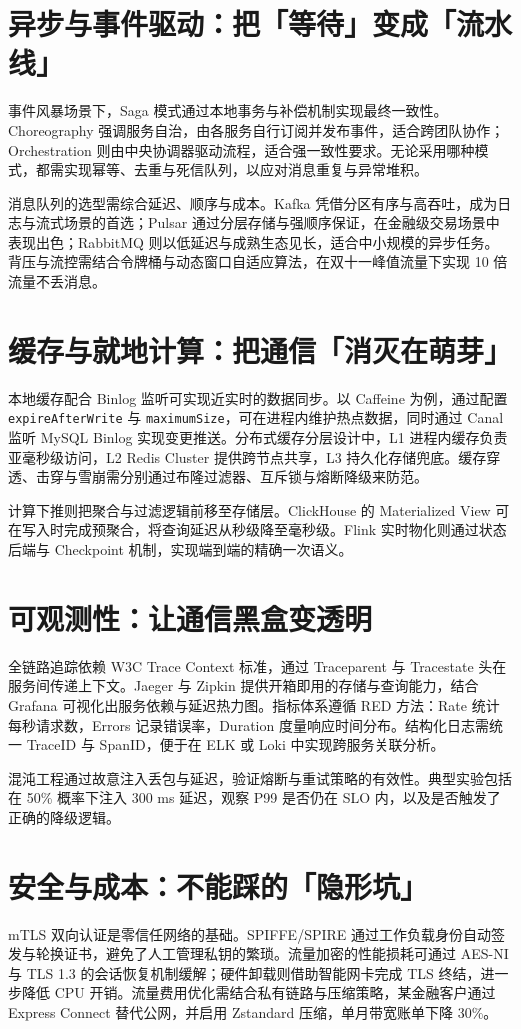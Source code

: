 \chapter{异步与事件驱动：把「等待」变成「流水线」}
事件风暴场景下，Saga 模式通过本地事务与补偿机制实现最终一致性。Choreography 强调服务自治，由各服务自行订阅并发布事件，适合跨团队协作；Orchestration 则由中央协调器驱动流程，适合强一致性要求。无论采用哪种模式，都需实现幂等、去重与死信队列，以应对消息重复与异常堆积。\par
消息队列的选型需综合延迟、顺序与成本。Kafka 凭借分区有序与高吞吐，成为日志与流式场景的首选；Pulsar 通过分层存储与强顺序保证，在金融级交易场景中表现出色；RabbitMQ 则以低延迟与成熟生态见长，适合中小规模的异步任务。背压与流控需结合令牌桶与动态窗口自适应算法，在双十一峰值流量下实现 10 倍流量不丢消息。\par
\chapter{缓存与就地计算：把通信「消灭在萌芽」}
本地缓存配合 Binlog 监听可实现近实时的数据同步。以 Caffeine 为例，通过配置 \texttt{expireAfterWrite} 与 \texttt{maximumSize}，可在进程内维护热点数据，同时通过 Canal 监听 MySQL Binlog 实现变更推送。分布式缓存分层设计中，L1 进程内缓存负责亚毫秒级访问，L2 Redis Cluster 提供跨节点共享，L3 持久化存储兜底。缓存穿透、击穿与雪崩需分别通过布隆过滤器、互斥锁与熔断降级来防范。\par
计算下推则把聚合与过滤逻辑前移至存储层。ClickHouse 的 Materialized View 可在写入时完成预聚合，将查询延迟从秒级降至毫秒级。Flink 实时物化则通过状态后端与 Checkpoint 机制，实现端到端的精确一次语义。\par
\chapter{可观测性：让通信黑盒变透明}
全链路追踪依赖 W3C Trace Context 标准，通过 Traceparent 与 Tracestate 头在服务间传递上下文。Jaeger 与 Zipkin 提供开箱即用的存储与查询能力，结合 Grafana 可视化出服务依赖与延迟热力图。指标体系遵循 RED 方法：Rate 统计每秒请求数，Errors 记录错误率，Duration 度量响应时间分布。结构化日志需统一 TraceID 与 SpanID，便于在 ELK 或 Loki 中实现跨服务关联分析。\par
混沌工程通过故意注入丢包与延迟，验证熔断与重试策略的有效性。典型实验包括在 50\%{} 概率下注入 300 ms 延迟，观察 P99 是否仍在 SLO 内，以及是否触发了正确的降级逻辑。\par
\chapter{安全与成本：不能踩的「隐形坑」}
mTLS 双向认证是零信任网络的基础。SPIFFE/SPIRE 通过工作负载身份自动签发与轮换证书，避免了人工管理私钥的繁琐。流量加密的性能损耗可通过 AES-NI 与 TLS 1.3 的会话恢复机制缓解；硬件卸载则借助智能网卡完成 TLS 终结，进一步降低 CPU 开销。流量费用优化需结合私有链路与压缩策略，某金融客户通过 Express Connect 替代公网，并启用 Zstandard 压缩，单月带宽账单下降 30\%{}。\par
